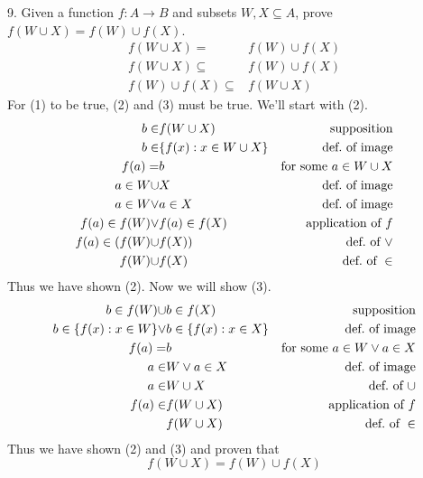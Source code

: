 \documentclass{article}
\begin{document}
\begin{exercise}{}{}
	{9. Given a function $f: A \rightarrow B$ and subsets $W, X
			\subseteq A$, prove $f(W \cup X)=f(W) \cup f(X)$.}
	\setcounter{equation}{0}
	\begin{align}
		f(W \cup X)=             & f(W) \cup f(X) \\
		f(W \cup X)\subseteq     & f(W) \cup f(X) \\
		f(W) \cup f(X) \subseteq & f(W \cup X)
	\end{align}
	For (1) to be true, (2) and (3) must be true. We'll start with (2).
	\begin{align}
		b\in                & f(W\cup X)                & \text{supposition}           \\
		b\in                & \{f(x): x \in W\cup X\} & \text{def.\ of image}        \\
		f(a) =              & b                         & \text{for some }a\in W\cup X \\
		a \in W \cup        & X                         & \text{def.\ of image}        \\
		a \in W \lor        & a \in X                   & \text{def.\ of image}        \\
		f(a) \in f(W) \lor  & f(a) \in f(X)             & \text{application of }f      \\
		f(a) \in (f(W) \cup & f(X))                     & \text{def.\ of }\lor         \\
		f(W) \cup           & f(X)                      & \text{def.\ of }\in
	\end{align}
	Thus we have shown (2). Now we will show (3).
	\begin{align}
		b\in f(W)\cup                 & b\in f(X)                & \text{supposition}                \\
		b\in \{f(x): x \in W\} \lor & b\in \{f(x): x \in X\} & \text{def.\ of image}             \\
		f(a) =                        & b                        & \text{for some }a\in W\lor a\in X \\
		a \in                         & W \lor a \in X           & \text{def.\ of image}             \\
		a \in                         & W \cup X                 & \text{def.\ of }\cup              \\
		f(a) \in                      & f(W\cup X)               & \text{application of }f           \\
		                              & f(W\cup X)               & \text{def.\ of }\in
	\end{align}
	Thus we have shown (2) and (3) and proven that
	\[
		f(W \cup X)=f(W) \cup f(X)
	\]
\end{exercise}{}{}
\end{document}
